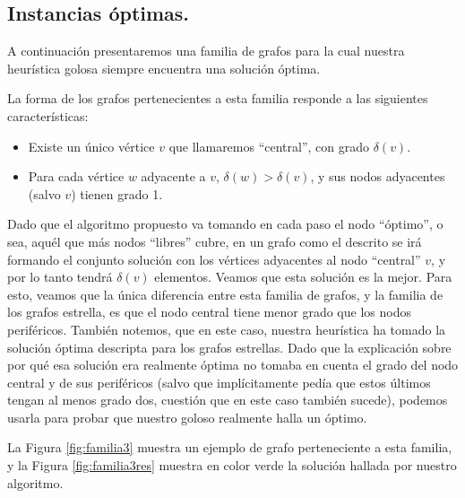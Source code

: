 \vspace*{0.6cm}

\subsection{Instancias óptimas.}

\vspace*{0.3cm}

A continuación presentaremos una familia de grafos para la cual nuestra heurística golosa siempre encuentra una solución óptima.

La forma de los grafos pertenecientes a esta familia responde a las siguientes características:

\begin{itemize}
\item Existe un único vértice $v$ que llamaremos ``central'', con grado $\delta(v)$.
\item Para cada vértice $w$ adyacente a $v$, $\delta(w) > \delta(v)$, y sus nodos adyacentes (salvo $v$) tienen grado 1.	
\end{itemize}

Dado que el algoritmo propuesto va tomando en cada paso el nodo ``óptimo'', o sea, aquél que más nodos ``libres'' cubre, en un grafo como el descrito se irá formando el conjunto solución con los vértices adyacentes al nodo ``central'' $v$, y por lo tanto tendrá $\delta(v)$ elementos.  Veamos que esta solución es la mejor. Para esto, veamos que la única diferencia entre esta familia de grafos, y la familia de los grafos estrella, es que el nodo central tiene menor grado que los nodos periféricos. También notemos, que en este caso, nuestra heurística ha tomado la solución óptima descripta para los grafos estrellas. Dado que la explicación sobre por qué esa solución era realmente óptima no tomaba en cuenta el grado del nodo central y de sus periféricos (salvo que implícitamente pedía que estos últimos tengan al menos grado dos, cuestión que en este caso también sucede), podemos usarla para probar que nuestro goloso realmente halla un óptimo.

La Figura \ref{fig:familia3} muestra un ejemplo de grafo perteneciente a esta familia, y la Figura \ref{fig:familia3res} muestra en color verde la solución hallada por nuestro algoritmo.


